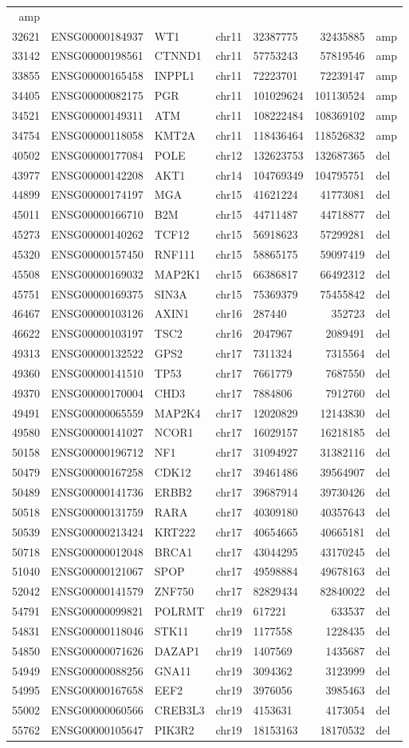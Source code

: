 \documentclass[]{article}
\begin{document}
\begin{longtable}[]{@{}rrlrlrl@{}}
amp\tabularnewline
32621 & ENSG00000184937 & WT1 & chr11 & 32387775 & 32435885 &
amp\tabularnewline
33142 & ENSG00000198561 & CTNND1 & chr11 & 57753243 & 57819546 &
amp\tabularnewline
33855 & ENSG00000165458 & INPPL1 & chr11 & 72223701 & 72239147 &
amp\tabularnewline
34405 & ENSG00000082175 & PGR & chr11 & 101029624 & 101130524 &
amp\tabularnewline
34521 & ENSG00000149311 & ATM & chr11 & 108222484 & 108369102 &
amp\tabularnewline
34754 & ENSG00000118058 & KMT2A & chr11 & 118436464 & 118526832 &
amp\tabularnewline
40502 & ENSG00000177084 & POLE & chr12 & 132623753 & 132687365 &
del\tabularnewline
43977 & ENSG00000142208 & AKT1 & chr14 & 104769349 & 104795751 &
del\tabularnewline
44899 & ENSG00000174197 & MGA & chr15 & 41621224 & 41773081 &
del\tabularnewline
45011 & ENSG00000166710 & B2M & chr15 & 44711487 & 44718877 &
del\tabularnewline
45273 & ENSG00000140262 & TCF12 & chr15 & 56918623 & 57299281 &
del\tabularnewline
45320 & ENSG00000157450 & RNF111 & chr15 & 58865175 & 59097419 &
del\tabularnewline
45508 & ENSG00000169032 & MAP2K1 & chr15 & 66386817 & 66492312 &
del\tabularnewline
45751 & ENSG00000169375 & SIN3A & chr15 & 75369379 & 75455842 &
del\tabularnewline
46467 & ENSG00000103126 & AXIN1 & chr16 & 287440 & 352723 &
del\tabularnewline
46622 & ENSG00000103197 & TSC2 & chr16 & 2047967 & 2089491 &
del\tabularnewline
49313 & ENSG00000132522 & GPS2 & chr17 & 7311324 & 7315564 &
del\tabularnewline
49360 & ENSG00000141510 & TP53 & chr17 & 7661779 & 7687550 &
del\tabularnewline
49370 & ENSG00000170004 & CHD3 & chr17 & 7884806 & 7912760 &
del\tabularnewline
49491 & ENSG00000065559 & MAP2K4 & chr17 & 12020829 & 12143830 &
del\tabularnewline
49580 & ENSG00000141027 & NCOR1 & chr17 & 16029157 & 16218185 &
del\tabularnewline
50158 & ENSG00000196712 & NF1 & chr17 & 31094927 & 31382116 &
del\tabularnewline
50479 & ENSG00000167258 & CDK12 & chr17 & 39461486 & 39564907 &
del\tabularnewline
50489 & ENSG00000141736 & ERBB2 & chr17 & 39687914 & 39730426 &
del\tabularnewline
50518 & ENSG00000131759 & RARA & chr17 & 40309180 & 40357643 &
del\tabularnewline
50539 & ENSG00000213424 & KRT222 & chr17 & 40654665 & 40665181 &
del\tabularnewline
50718 & ENSG00000012048 & BRCA1 & chr17 & 43044295 & 43170245 &
del\tabularnewline
51040 & ENSG00000121067 & SPOP & chr17 & 49598884 & 49678163 &
del\tabularnewline
52042 & ENSG00000141579 & ZNF750 & chr17 & 82829434 & 82840022 &
del\tabularnewline
54791 & ENSG00000099821 & POLRMT & chr19 & 617221 & 633537 &
del\tabularnewline
54831 & ENSG00000118046 & STK11 & chr19 & 1177558 & 1228435 &
del\tabularnewline
54850 & ENSG00000071626 & DAZAP1 & chr19 & 1407569 & 1435687 &
del\tabularnewline
54949 & ENSG00000088256 & GNA11 & chr19 & 3094362 & 3123999 &
del\tabularnewline
54995 & ENSG00000167658 & EEF2 & chr19 & 3976056 & 3985463 &
del\tabularnewline
55002 & ENSG00000060566 & CREB3L3 & chr19 & 4153631 & 4173054 &
del\tabularnewline
55762 & ENSG00000105647 & PIK3R2 & chr19 & 18153163 & 18170532 &
del\tabularnewline
\bottomrule
\end{longtable}
\end{document}
